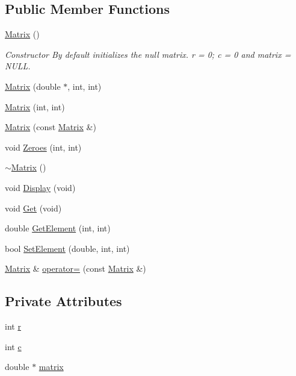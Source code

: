 \subsection*{\-Public \-Member \-Functions}
\begin{DoxyCompactItemize}
\item 
\hyperlink{classchittmatrix_1_1Matrix_ad58cf615c96778a1098003ea90848b3b}{\-Matrix} ()
\begin{DoxyCompactList}\small\item\em \-Constructor \-By default initializes the null matrix. r = 0; c = 0 and matrix = \-N\-U\-L\-L. \end{DoxyCompactList}\item 
\hyperlink{classchittmatrix_1_1Matrix_ab53232b2ed2484b83c2c5b8c989bddc8}{\-Matrix} (double $\ast$, int, int)
\item 
\hyperlink{classchittmatrix_1_1Matrix_a2c5ff19978df7737a74d0ed1bbc579d4}{\-Matrix} (int, int)
\item 
\hyperlink{classchittmatrix_1_1Matrix_a28063166bcb3ccf22609efb910019c42}{\-Matrix} (const \hyperlink{classchittmatrix_1_1Matrix}{\-Matrix} \&)
\item 
void \hyperlink{classchittmatrix_1_1Matrix_ad249017ca911fe565ea1f0287eeeb6ec}{\-Zeroes} (int, int)
\item 
\hyperlink{classchittmatrix_1_1Matrix_a8e6ac27f11872b9111d235983b24ee62}{$\sim$\-Matrix} ()
\item 
void \hyperlink{classchittmatrix_1_1Matrix_a61e8ae9976c1f9a0227492abfb242784}{\-Display} (void)
\item 
void \hyperlink{classchittmatrix_1_1Matrix_a489c3c08d25d53fa59a67e8e57e7ce21}{\-Get} (void)
\item 
double \hyperlink{classchittmatrix_1_1Matrix_a1099979ca687000b29ae95bb3d50d5dd}{\-Get\-Element} (int, int)
\item 
bool \hyperlink{classchittmatrix_1_1Matrix_acb094736c22c73105003f02da1c75c7d}{\-Set\-Element} (double, int, int)
\item 
\hyperlink{classchittmatrix_1_1Matrix}{\-Matrix} \& \hyperlink{classchittmatrix_1_1Matrix_a1ccb184ce5907bc7df2edb234db9bab8}{operator=} (const \hyperlink{classchittmatrix_1_1Matrix}{\-Matrix} \&)
\end{DoxyCompactItemize}
\subsection*{\-Private \-Attributes}
\begin{DoxyCompactItemize}
\item 
int \hyperlink{classchittmatrix_1_1Matrix_a3dba1697809db31f6341dd80abf8545d}{r}
\item 
int \hyperlink{classchittmatrix_1_1Matrix_aab6aec1cade4ba4006674bbb57eaad7c}{c}
\item 
double $\ast$ \hyperlink{classchittmatrix_1_1Matrix_ae59d87ec4c53e05bae49f1770151ac8f}{matrix}
\end{DoxyCompactItemize}
